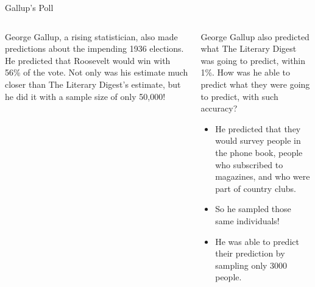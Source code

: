 \documentclass[aspectratio=169]{../latex_main/tntbeamer}  %
\begin{document}
	\begin{frame}{Gallup’s Poll}
	    \begin{columns}
	        \begin{column}{.4\textwidth}
	            George Gallup, a rising statistician, also made predictions about the impending 1936 elections. He predicted that Roosevelt would win with 56\% of the vote.
                \bigskip
                Not only was his estimate much closer than The Literary Digest’s estimate, but he did it with a sample size of only 50,000!
	        \end{column}
	        
	        \begin{column}{.5\textwidth}
	            George Gallup also predicted what The Literary Digest was going to predict, within 1\%. How was he able to predict what they were going to predict, with such accuracy?
                
                \begin{itemize}
                    \item He predicted that they would survey people in the phone book, people who subscribed to magazines, and who were part of country clubs.
                    \item So he sampled those same individuals!
                    \item He was able to predict their prediction by sampling only 3000 people.
                \end{itemize}
	        \end{column}
	        
	    \end{columns}
	    
	\end{frame}
	
\end{document}
